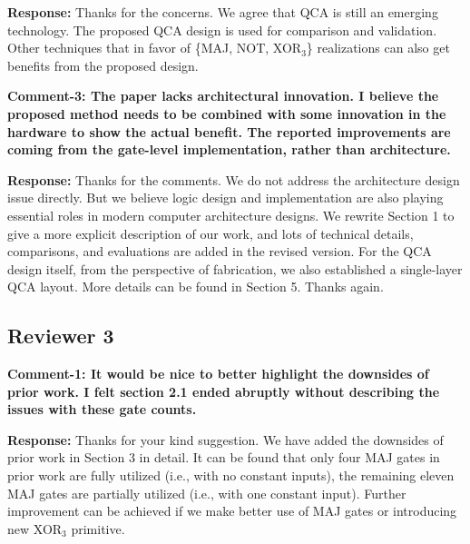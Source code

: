 \documentclass[9pt,journal,compsoc]{IEEEtran}
\begin{document}
\begin{appendices}
{\bfseries Response:} Thanks for the concerns. We agree that QCA is still an emerging technology. The proposed QCA design is used for comparison and validation. Other techniques that in favor of \{MAJ, NOT, XOR$_3$\} realizations can also get benefits from the proposed design.
%

{\bfseries Comment-3: The paper lacks architectural innovation. I believe the proposed method needs to be combined with some innovation in the hardware to show the actual benefit. The reported improvements are coming from the gate-level implementation, rather than architecture.}

{\bfseries Response:} Thanks for the comments. We do not address the architecture design issue directly. But we believe logic design and implementation are also playing essential roles in modern computer architecture designs.
We rewrite Section 1 to give a more explicit description of our work, and lots of technical details, comparisons, and evaluations are added in the revised version.
For the QCA design itself, from the perspective of fabrication, we also established a single-layer QCA layout. More details can be found in Section 5.  
Thanks again.  

\subsection{ Reviewer 3}
{\bfseries Comment-1: It would be nice to better highlight the downsides of prior work. I felt section 2.1 ended abruptly without describing the issues with these gate counts.}

{\bfseries Response:} Thanks for your kind suggestion. We have added the downsides of prior work in Section 3 in detail. It can be found that only four MAJ gates in prior work are fully utilized (i.e., with no constant inputs), the remaining eleven MAJ gates are partially utilized (i.e., with one constant input). Further improvement can be achieved if we make better use of MAJ gates or introducing new XOR$_3$ primitive.


\end{appendices}
\end{document}
